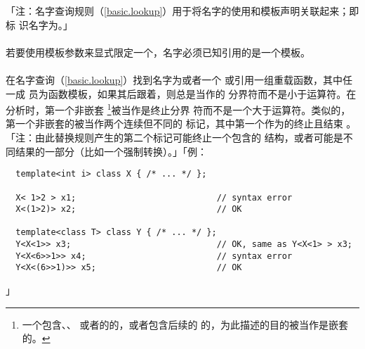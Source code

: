 「注：名字查询规则（\ref{basic.lookup}）用于将名字的使用和模板声明关联起来；即标
识名字为。」

\paragraph{}
若要使用模板参数来显式限定一个，名字必须已知引用的是一个模板。

\paragraph{}
在名字查询（\ref{basic.lookup}）找到名字为或者一个
或引用一组重载函数，其中任一成
员为函数模板，如果其后跟着\tm{<}，则\tm{<}总是当作的
分界符而不是小于运算符。在分析时，第一个非嵌套\tm{>}
\footnote{一个包含、、
或者的的\tm{>}，或者包含后续的
的\tm{>}，为此描述的目的被当作是嵌套的。}被当作是终止分界
符而不是一个大于运算符。类似的，第一个非嵌套的\tm{>{}>}被当作两个连续但不同的
\tm{>}标记，其中第一个作为的终止且结束
。「注：由此替换规则产生的第二个\tm{>}标记可能终止一个包含的
结构，或者可能是不同结果的一部分（比如一个强制转换）。」「例：
\begin{lstlisting}
  template<int i> class X { /* ... */ };

  X< 1>2 > x1;                            // syntax error
  X<(1>2)> x2;                            // OK

  template<class T> class Y { /* ... */ };
  Y<X<1>> x3;                             // OK, same as Y<X<1> > x3;
  Y<X<6>>1>> x4;                          // syntax error
  Y<X<(6>>1)>> x5;                        // OK
\end{lstlisting}」

